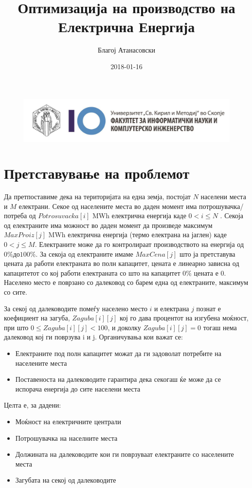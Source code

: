 \documentclass{article}
\title{Оптимизација на производство на Електрична Енергија}
\date{2018-01-16}
\author{Благој Атанасовски}
\begin{document}
\begin{figure}
\includegraphics[scale=.4]{image}
\end{figure}

\maketitle
\newpage

\section{Претставување на проблемот}
Да претпоставиме дека на територијата на една земја, постојат $N$ населени места и $M$ електрани. Секое од населените места во даден момент има потрошувачка/потреба од $ Potrosuvacka[i] $ MWh електрична енергија каде $ 0 < i \leq N $ . Секоја од електраните има можност во даден момент да произведе максимум $MaxProiz[j]$ MWh електрична енергија (термо електрана на јаглен) каде $0 < j \leq M$. Електраните може да го контролираат производството на енергија од $0\% до 100\%$. За секоја од електраните имаме $MaxCena[j]$ што ја претставува цената да работи електраната во полн капацитет, цената е линеарно зависна од капацитетот со кој работи електраната со што на капацитет 0\% цената е 0. Населено место е поврзано со далековод со барем една од електраните, максимум со сите. 

За секој од далеководите помеѓу населено место $i$ и електрана $j$ познат е коефициент на загуба, $Zaguba[i][j]$ кој го дава процентот на изгубена моќност, при што $0 \leq Zaguba[i][j] < 100 $, и доколку $Zaguba[i][j] = 0$ тогаш нема далековод кој ги поврзува i и j. Органичувања кои важат се:
\begin{itemize}
\item Електраните под полн капацитет можат да ги задоволат потребите на населените места
\item Поставеноста на далеководите гарантира дека секогаш ќе може да се испорача енергија до сите населени места
\end{itemize}

Целта е, за дадени:
\begin{itemize}
\item Моќност на електричните централи
\item Потрошувачка на населните места
\item Должината на далеководите кои ги поврзуваат електраните со населените места
\item Загубата на секој од далеководите
\end{itemize}
\end{document}
